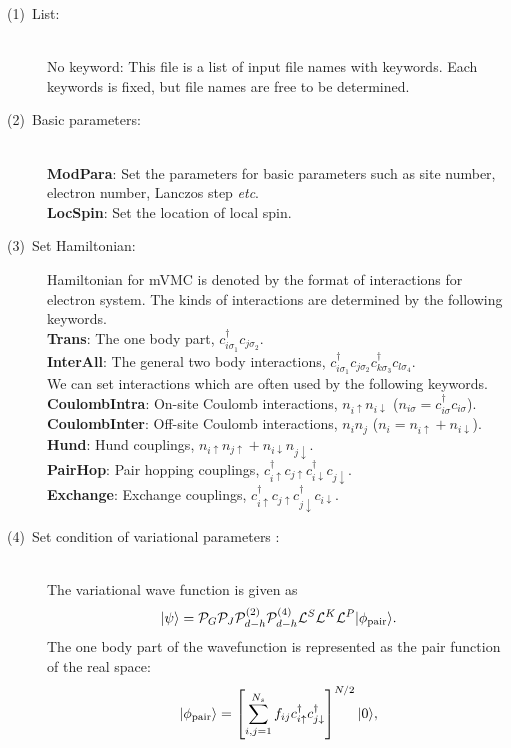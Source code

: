 \begin{description}
\item[(1)~List:]
~\\{No keyword}:
This file is a list of input file names with keywords. Each keywords is fixed, but file names are free to be determined.  
\item[(2)~Basic parameters:]
~\\{\bf ModPara}: Set the parameters for basic parameters such as site number, electron number, Lanczos step {\it etc}.
~\\{\bf LocSpin}: Set the location of local spin. 
\item[(3)~Set Hamiltonian:] 
Hamiltonian for mVMC is denoted by the format of interactions for electron system. 
The kinds of interactions are determined by the following keywords. 
~\\{\bf Trans}: The one body part, $c_{i\sigma_1}^{\dag}c_{j\sigma_2}$.
~\\{\bf InterAll}: The general two body interactions, $c_ {i \sigma_1}^{\dag}c_{j\sigma_2}c_{k \sigma_3}^{\dag}c_{l \sigma_4}$.
~\\We can set interactions which are often used by the following keywords. 
~\\{\bf CoulombIntra}: On-site Coulomb interactions, $n_ {i \uparrow}n_{i \downarrow}$ ($n_{i \sigma}=c_{i\sigma}^{\dag}c_{i\sigma}$).
~\\{\bf CoulombInter}: Off-site Coulomb interactions, $n_ {i}n_{j}$ ($n_i=n_{i\uparrow}+n_{i\downarrow}$).
~\\{\bf Hund}: Hund couplings, $n_{i\uparrow}n_{j\uparrow}+n_{i\downarrow}n_{j\downarrow}$.
~\\{\bf PairHop}: Pair hopping couplings, $c_ {i \uparrow}^{\dag}c_{j\uparrow}c_{i \downarrow}^{\dag}c_{j  \downarrow}$.
~\\{\bf Exchange}: Exchange couplings, $c_ {i \uparrow}^{\dag}c_{j\uparrow}c_{j \downarrow}^{\dag}c_{i  \downarrow}$.
\item[(4)~Set condition of variational parameters :] 
~\\The variational wave function is given as
\begin{equation}
|\psi \rangle = {\cal P}_G{\cal P}_J{\cal P}_{d-h}^{(2)}{\cal P}_{d-h}^{(4)}{\cal L}^S{\cal L}^K{\cal L}^P |\phi_{\rm pair} \rangle.
\end{equation}
The one body part of the wavefunction is represented as the pair function of the real space:
\begin{equation}
|\phi_{\rm pair} \rangle = \left[\sum_{i, j=1}^{N_s} f_{ij}c_{i\uparrow}^{\dag}c_{j\downarrow}^{\dag} \right]^{N/2}|0 \rangle,

\end{equation}
\end{description}
